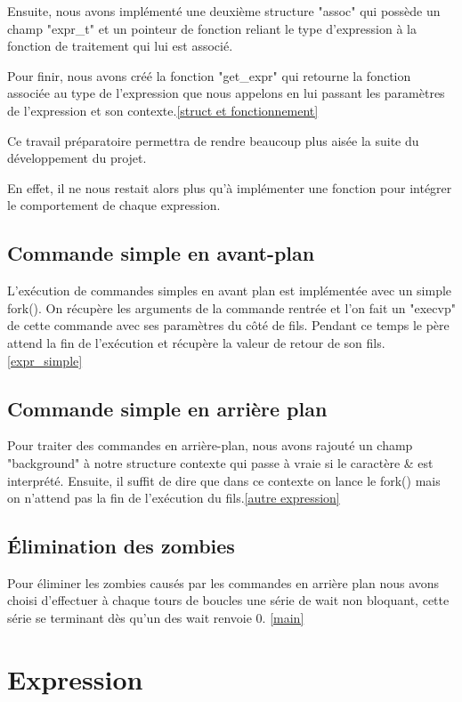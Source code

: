 \documentclass[12pt]{article}
\begin{document}
 Ensuite, nous avons implémenté une deuxième structure "assoc" qui possède un champ "expr\_t"
 et un pointeur de fonction reliant le type d'expression à la fonction de traitement
 qui lui est associé.
 
 Pour finir, nous avons créé la fonction "get\_expr" qui retourne la fonction associée au 
 type de l'expression que nous appelons en lui passant les paramètres de l'expression et son 
 contexte.\ref{struct et fonctionnement}
 
 Ce travail préparatoire permettra de rendre beaucoup plus aisée la suite du développement
 du projet.
 
 En effet, il ne nous restait alors plus qu'à implémenter une fonction pour intégrer le comportement
 de chaque expression.
 
 \subsection{Commande simple en avant-plan}
 
 L'exécution de commandes simples en avant plan est implémentée avec un simple fork().
 On récupère les arguments de la commande rentrée et l'on fait un "execvp" de cette commande
 avec ses paramètres du côté de fils. Pendant ce temps le père attend la fin de l'exécution
 et récupère la valeur de retour de son fils.\ref{expr_simple}
 
 \subsection{Commande simple en arrière plan}
 
 Pour traiter des commandes en arrière-plan, nous avons rajouté un champ "background"
à notre structure contexte qui passe à vraie si le caractère \& est interprété.
 Ensuite, il suffit de dire que dans ce contexte on lance le fork() mais on n’attend pas
la fin de l'exécution du fils.\ref{autre expression}
 
 
 \subsection{Élimination des zombies}

 Pour éliminer les zombies causés par les commandes en arrière plan nous avons choisi d'effectuer
 à chaque tours de boucles une série de wait non bloquant, cette série se terminant dès qu'un des
 wait renvoie 0. \ref{main}
 

\newpage
\section{Expression}
\end{document}
